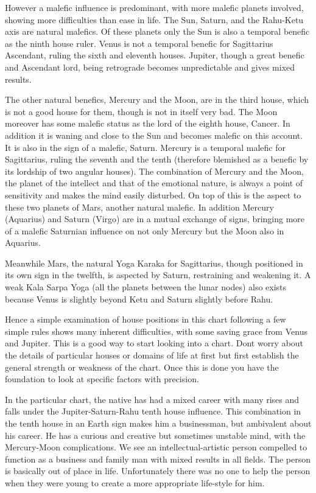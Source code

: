 However a malefic influence is predominant, with more malefic planets involved, showing more difficulties than ease in life. The Sun, Saturn, and the Rahu-Ketu axis are natural malefics. Of these planets only the Sun is also a temporal benefic as the ninth house ruler. Venus is not a temporal benefic for Sagittarius Ascendant, ruling the sixth and eleventh houses. Jupiter, though a great benefic and Ascendant lord, being retrograde becomes unpredictable and gives mixed results.

 

The other natural benefics, Mercury and the Moon, are in the third house, which is not a good house for them, though is not in itself very bad. The Moon moreover has some malefic status as the lord of the eighth house, Cancer. In addition it is waning and close to the Sun and becomes malefic on this account. It is also in the sign of a malefic, Saturn. Mercury is a temporal malefic for Sagittarius, ruling the seventh and the tenth (therefore blemished as a benefic by its lordship of two angular houses). The combination of Mercury and the Moon, the planet of the intellect and that of the emotional nature, is always a point of sensitivity and makes the mind easily disturbed. On top of this is the aspect to these two planets of Mars, another natural malefic. In addition Mercury (Aquarius) and Saturn (Virgo) are in a mutual exchange of signs, bringing more of a malefic Saturnian influence on not only Mercury but the Moon also in Aquarius.

 

Meanwhile Mars, the natural Yoga Karaka for Sagittarius, though positioned in its own sign in the twelfth, is aspected by Saturn, restraining and weakening it. A weak Kala Sarpa Yoga (all the planets between the lunar nodes) also exists because Venus is slightly beyond Ketu and Saturn slightly before Rahu.

 

Hence a simple examination of house positions in this chart following a few simple rules shows many inherent difficulties, with some saving grace from Venus and Jupiter. This is a good way to start looking into a chart. Dont worry about the details of particular houses or domains of life at first but first establish the general strength or weakness of the chart. Once this is done you have the foundation to look at specific factors with precision.

 

In the particular chart, the native has had a mixed career with many rises and falls under the Jupiter-Saturn-Rahu tenth house influence. This combination in the tenth house in an Earth sign makes him a businessman, but ambivalent about his career. He has a curious and creative but sometimes unstable mind, with the Mercury-Moon complications. We see an intellectual-artistic person compelled to function as a business and family man with mixed results in all fields. The person is basically out of place in life. Unfortunately there was no one to help the person when they were young to create a more appropriate life-style for him.

